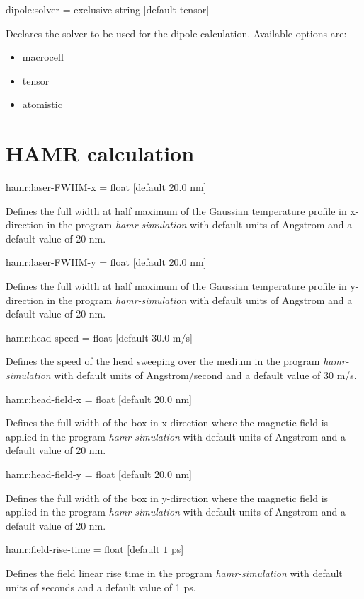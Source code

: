 {\zicf dipole:solver = exclusive string [default tensor]}
Declares the solver to be used for the dipole calculation. Available options are:
\begin{itemize}
  \item[] macrocell
  \item[] tensor
  \item[] atomistic
\end{itemize}

\section*{HAMR calculation}
{\zicf hamr:laser-FWHM-x = float [default $20.0$ nm]}
Defines the full width at half maximum of the Gaussian temperature profile in x-direction 
in the program \textit{hamr-simulation} with default units of Angstrom and a default value of 20 nm.

{\zicf hamr:laser-FWHM-y = float [default $20.0$ nm]}
Defines the full width at half maximum of the Gaussian temperature profile in y-direction 
in the program \textit{hamr-simulation} with default units of Angstrom and a default value of 20 nm.

{\zicf hamr:head-speed = float [default $30.0$ m/s]}
Defines the speed of the head sweeping over the medium 
in the program \textit{hamr-simulation} with default units of Angstrom/second and a default value of 30 m/s.

{\zicf hamr:head-field-x = float [default $20.0$ nm]}
Defines the full width of the box in x-direction where the magnetic field is applied
in the program \textit{hamr-simulation} with default units of Angstrom and a default value of 20 nm.

{\zicf hamr:head-field-y = float [default $20.0$ nm]}
Defines the full width of the box in y-direction where the magnetic field is applied
in the program \textit{hamr-simulation} with default units of Angstrom and a default value of 20 nm.

{\zicf hamr:field-rise-time = float [default $1$ ps]}
Defines the field linear rise time in the program \textit{hamr-simulation} with default units of seconds and a default value of 1 ps.

